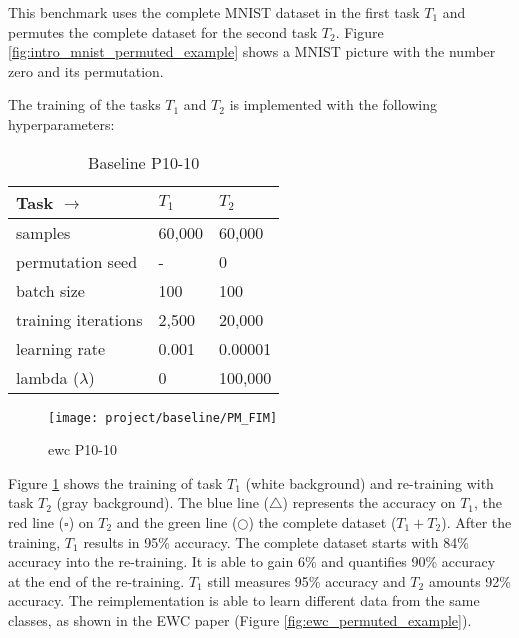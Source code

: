 This benchmark uses the complete MNIST dataset in the first task $T_1$ and permutes the complete dataset for the second task $T_2$.
Figure \ref{fig:intro_mnist_permuted_example} shows a MNIST picture with the number zero and its permutation.

The training of the tasks $T_1$ and $T_2$ is implemented with the following hyperparameters:

\begin{table}[H]
    \centering
    \begin{tabular}{ |l|l|l| }
        \hline
        Task $\to$ & $T_1$ & $T_2$ \\
        \hline\hline
        samples & 60,000 & 60,000 \\
        \hline
        permutation seed & - & 0 \\
        \hline
        batch size & 100 & 100 \\
        \hline
        training iterations & 2,500 & 20,000 \\
        \hline
        learning rate & 0.001 & 0.00001 \\
        \hline
        lambda ($\lambda$) & 0 & 100,000 \\
        \hline
    \end{tabular}
    \caption{Baseline P10-10}
    \label{table:base_p1010}
\end{table}

\begin{figure}[H]
    \centering
    \texttt{[image: project/baseline/PM\_FIM]}
    \caption{\acrshort{ewc} P10-10}
    \label{fig:ewc_p10-10}
\end{figure}

Figure \ref{fig:ewc_p10-10} shows the training of task $T_1$ (white background) and re-training with task $T_2$ (gray background).
The blue line ($\triangle$) represents the accuracy on $T_1$, the red line ($\square$) on $T_2$ and the green line ($\bigcirc$) the complete dataset ($T_1 + T_2$).
After the training, $T_1$ results in 95\% accuracy.
The complete dataset starts with 84\% accuracy into the re-training.
It is able to gain 6\% and quantifies 90\% accuracy at the end of the re-training.
$T_1$ still measures 95\% accuracy and $T_2$ amounts 92\% accuracy.
\newline
The reimplementation is able to learn different data from the same classes, as shown in the EWC paper \cite{elastic-weight-consolidation} (Figure \ref{fig:ewc_permuted_example}).

\newpage

